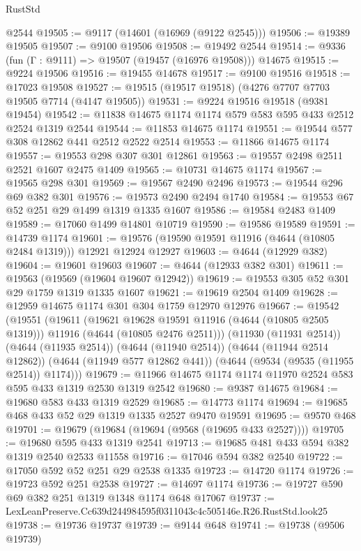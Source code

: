 \begin{lexlean}{RustStd}
\begin{coremodule}
    @2544
@19505 := @9117 (@14601 (@16969 (@9122 @2545)))
@19506 := @19389 @19505
@19507 := @9100 @19506
@19508 := @19492 @2544
@19514 := @9336 (fun (Γ : @9111) => @19507 (@19457 (@16976 @19508))) @14675
@19515 := @9224 @19506
@19516 := @19455 @14678
@19517 := @9100 @19516
@19518 := @17023 @19508
@19527 := @19515 (@19517 @19518) (@4276 @7707 @7703 @19505 @7714 (@4147 @19505))
@19531 := @9224 @19516 @19518 (@9381 @19454)
@19542 := @11838 @14675 @1174 @1174 @579 @583 @595 @433 @2512 @2524 @1319 @2544
@19544 := @11853 @14675 @1174
@19551 := @19544 @577 @308 @12862 @441 @2512 @2522 @2514
@19553 := @11866 @14675 @1174
@19557 := @19553 @298 @307 @301 @12861
@19563 := @19557 @2498 @2511 @2521 @1607 @2475 @1409
@19565 := @10731 @14675 @1174
@19567 := @19565 @298 @301
@19569 := @19567 @2490 @2496
@19573 := @19544 @296 @69 @382 @301
@19576 := @19573 @2490 @2494 @1740
@19584 := @19553 @67 @52 @251 @29 @1499 @1319 @1335 @1607
@19586 := @19584 @2483 @1409
@19589 := @17060 @1499 @14801 @10719
@19590 := @19586 @19589
@19591 := @14739 @1174
@19601 := @19576 (@19590 @19591 @11916 (@4644 (@10805 @2484 @1319))) @12921 @12924 @12927
@19603 := @4644 (@12929 @382)
@19604 := @19601 @19603
@19607 := @4644 (@12933 @382 @301)
@19611 := @19563 (@19569 (@19604 @19607 @12942))
@19619 := @19553 @305 @52 @301 @29 @1759 @1319 @1335 @1607
@19621 := @19619 @2504 @1409
@19628 := @12959 @14675 @1174 @301 @304 @1759 @12970 @12976
@19667 := @19542
    (@19551
      (@19611
        (@19621 @19628 @19591 @11916 (@4644 (@10805 @2505 @1319)))
        @11916
        (@4644 (@10805 @2476 @2511)))
      (@11930 (@11931 @2514))
      (@4644 (@11935 @2514))
      (@4644 (@11940 @2514))
      (@4644 (@11944 @2514 @12862))
      (@4644 (@11949 @577 @12862 @441))
      (@4644 (@9534 (@9535 (@11955 @2514)) @1174)))
@19679 := @11966 @14675 @1174 @1174 @11970 @2524 @583 @595 @433 @1319 @2530 @1319 @2542
@19680 := @9387 @14675
@19684 := @19680 @583 @433 @1319 @2529
@19685 := @14773 @1174
@19694 := @19685 @468 @433 @52 @29 @1319 @1335 @2527 @9470 @19591
@19695 := @9570 @468
@19701 := @19679 (@19684 (@19694 (@9568 (@19695 @433 @2527))))
@19705 := @19680 @595 @433 @1319 @2541
@19713 := @19685 @481 @433 @594 @382 @1319 @2540 @2533 @11558
@19716 := @17046 @594 @382 @2540
@19722 := @17050 @592 @52 @251 @29 @2538 @1335
@19723 := @14720 @1174
@19726 := @19723 @592 @251 @2538
@19727 := @14697 @1174
@19736 := @19727 @590 @69 @382 @251 @1319 @1348 @1174 @648 @17067
@19737 := LexLeanPreserve.Cc639d244984595f0311043c4c505146e.R26.RustStd.look25
@19738 := @19736 @19737
@19739 := @9144 @648
@19741 := @19738 (@9506 @19739)

\end{coremodule}
\end{lexlean}
